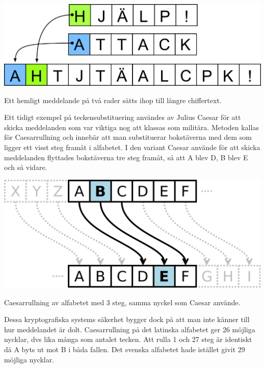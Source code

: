 \documentclass{article}
\begin{document}
\begin{center}
\includegraphics[width=\textwidth]{subst}

Ett hemligt meddelande på två rader sätts ihop till längre chiffertext.\newline
\end{center}

\noindent Ett tidigt exempel på teckensubstituering användes av Julius Caesar för att skicka meddelanden som var viktiga nog att klassas som militära. Metoden kallas för Caesarrullning och innebär att man substituerar bokstäverna med dem som ligger ett visst steg framåt i alfabetet. I den variant Caesar använde för att skicka meddelanden flyttades bokstäverna tre steg framåt, så att A blev D, B blev E och så vidare.\newline

\begin{center}
\includegraphics[width=\textwidth]{caesar}

Caesarrullning av alfabetet med 3 steg, samma nyckel som Caesar använde.\newline
\end{center}

\noindent Dessa kryptografiska systems säkerhet bygger dock på att man inte känner till hur meddelandet är dolt. Caesarrullning på det latinska alfabetet ger 26 möjliga nycklar, dvs lika många som antalet tecken. Att rulla 1 och 27 steg är identiskt då A byts ut mot B i båda fallen. Det svenska alfabetet hade istället givit 29 möjliga nycklar.
\end{document}
